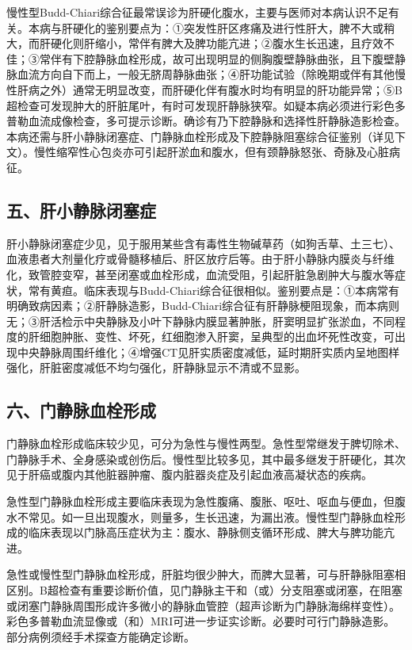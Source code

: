 慢性型Budd-Chiari综合征最常误诊为肝硬化腹水，主要与医师对本病认识不足有关。本病与肝硬化的鉴别要点为：①突发性肝区疼痛及进行性肝大，脾不大或稍大，而肝硬化则肝缩小，常伴有脾大及脾功能亢进；②腹水生长迅速，且疗效不佳；③常伴有下腔静脉血栓形成，故可出现明显的侧胸腹壁静脉曲张，且下腹壁静脉血流方向自下而上，一般无脐周静脉曲张；④肝功能试验（除晚期或伴有其他慢性肝病之外）通常无明显改变，而肝硬化伴有腹水时均有明显的肝功能异常；⑤B超检查可发现肿大的肝脏尾叶，有时可发现肝静脉狭窄。如疑本病必须进行彩色多普勒血流成像检查，多可提示诊断。确诊有乃下腔静脉和选择性肝静脉造影检查。本病还需与肝小静脉闭塞症、门静脉血栓形成及下腔静脉阻塞综合征鉴别（详见下文）。慢性缩窄性心包炎亦可引起肝淤血和腹水，但有颈静脉怒张、奇脉及心脏病征。

\subsection{五、肝小静脉闭塞症}

肝小静脉闭塞症少见，见于服用某些含有毒性生物碱草药（如狗舌草、土三七）、血液患者大剂量化疗或骨髓移植后、肝区放疗后等。由于肝小静脉内膜炎与纤维化，致管腔变窄，甚至闭塞或血栓形成，血流受阻，引起肝脏急剧肿大与腹水等症状，常有黄疸。临床表现与Budd-Chiari综合征很相似。鉴别要点是：①本病常有明确致病因素；②肝静脉造影，Budd-Chiari综合征有肝静脉梗阻现象，而本病则无；③肝活检示中央静脉及小叶下静脉内膜显著肿胀，肝窦明显扩张淤血，不同程度的肝细胞肿胀、变性、坏死，红细胞渗入肝窦，呈典型的出血坏死性改变，可出现中央静脉周围纤维化；④增强CT见肝实质密度减低，延时期肝实质内呈地图样强化，肝脏密度减低不均匀强化，肝静脉显示不清或不显影。

\subsection{六、门静脉血栓形成}

门静脉血栓形成临床较少见，可分为急性与慢性两型。急性型常继发于脾切除术、门静脉手术、全身感染或创伤后。慢性型比较多见，其中最多继发于肝硬化，其次见于肝癌或腹内其他脏器肿瘤、腹内脏器炎症及引起血液高凝状态的疾病。

急性型门静脉血栓形成主要临床表现为急性腹痛、腹胀、呕吐、呕血与便血，但腹水不常见。如一旦出现腹水，则量多，生长迅速，为漏出液。慢性型门静脉血栓形成的临床表现以门脉高压症状为主：腹水、静脉侧支循环形成、脾大与脾功能亢进。

急性或慢性型门静脉血栓形成，肝脏均很少肿大，而脾大显著，可与肝静脉阻塞相区别。B超检查有重要诊断价值，见门静脉主干和（或）分支阻塞或闭塞，在阻塞或闭塞门静脉周围形成许多微小的静脉血管腔（超声诊断为门静脉海绵样变性）。彩色多普勒血流显像或（和）MRI可进一步证实诊断。必要时可行门静脉造影。部分病例须经手术探查方能确定诊断。

